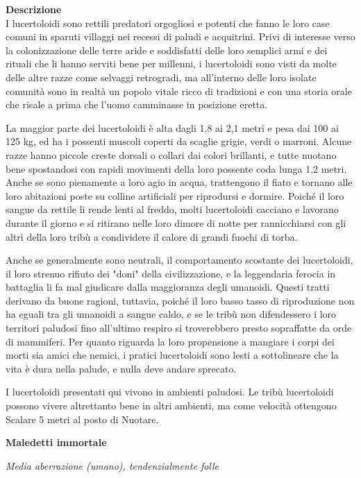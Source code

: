 \begin{multicols}{2}
\textbf{Descrizione}\\
I lucertoloidi sono rettili predatori orgogliosi e potenti che fanno le loro case comuni in sparuti villaggi nei recessi di paludi e acquitrini. Privi di interesse verso la colonizzazione delle terre aride e soddisfatti delle loro semplici armi e dei rituali che li hanno serviti bene per millenni, i lucertoloidi sono visti da molte delle altre razze come selvaggi retrogradi, ma all'interno delle loro isolate comunità sono in realtà un popolo vitale ricco di tradizioni e con una storia orale che risale a prima che l'uomo camminasse in posizione eretta.

La maggior parte dei lucertoloidi è alta dagli 1,8 ai 2,1 metri e pesa dai 100 ai 125 kg, ed ha i possenti muscoli coperti da scaglie grigie, verdi o marroni. Alcune razze hanno piccole creste dorsali o collari dai colori brillanti, e tutte nuotano bene spostandosi con rapidi movimenti della loro possente coda lunga 1,2 metri. Anche se sono pienamente a loro agio in acqua, trattengono il fiato e tornano alle loro abitazioni poste su colline artificiali per riprodursi e dormire. Poiché il loro sangue da rettile li rende lenti al freddo, molti lucertoloidi cacciano e lavorano durante il giorno e si ritirano nelle loro dimore di notte per rannicchiarsi con gli altri della loro tribù a condividere il calore di grandi fuochi di torba.

Anche se generalmente sono neutrali, il comportamento scostante dei lucertoloidi, il loro strenuo rifiuto dei "doni" della civilizzazione, e la leggendaria ferocia in battaglia li fa mal giudicare dalla maggioranza degli umanoidi. Questi tratti derivano da buone ragioni, tuttavia, poiché il loro basso tasso di riproduzione non ha eguali tra gli umanoidi a sangue caldo, e se le tribù non difendessero i loro territori paludosi fino all'ultimo respiro si troverebbero presto sopraffatte da orde di mammiferi. Per quanto riguarda la loro propensione a mangiare i corpi dei morti sia amici che nemici, i pratici lucertoloidi sono lesti a sottolineare che la vita è dura nella palude, e nulla deve andare sprecato.

I lucertoloidi presentati qui vivono in ambienti paludosi. Le tribù lucertoloidi possono vivere altrettanto bene in altri ambienti, ma come velocità ottengono Scalare 5 metri al posto di Nuotare.


\medskip{}\textbf{Maledetti immortale}

\textit{Media aberrazione (umano), tendenzialmente folle}


\end{multicols}
